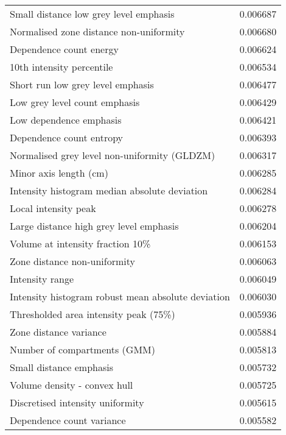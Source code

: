 \begin{longtable}{|lr|}
Small distance low grey level emphasis             &        0.006687 \\
Normalised zone distance non-uniformity            &        0.006680 \\
Dependence count energy                            &        0.006624 \\
10th intensity percentile                          &        0.006534 \\
Short run low grey level emphasis                  &        0.006477 \\
Low grey level count emphasis                      &        0.006429 \\
Low dependence emphasis                            &        0.006421 \\
Dependence count entropy                           &        0.006393 \\
Normalised grey level non-uniformity (GLDZM)       &        0.006317 \\
Minor axis length (cm)                             &        0.006285 \\
Intensity histogram median absolute deviation      &        0.006284 \\
Local intensity peak                               &        0.006278 \\
Large distance high grey level emphasis            &        0.006204 \\
Volume at intensity fraction 10\%                   &        0.006153 \\
Zone distance non-uniformity                       &        0.006063 \\
Intensity range                                    &        0.006049 \\
Intensity histogram robust mean absolute deviation &        0.006030 \\
Thresholded area intensity peak (75\%)              &        0.005936 \\
Zone distance variance                             &        0.005884 \\
Number of compartments (GMM)                       &        0.005813 \\
Small distance emphasis                            &        0.005732 \\
Volume density - convex hull                       &        0.005725 \\
Discretised intensity uniformity                   &        0.005615 \\
Dependence count variance                          &        0.005582 \\

\end{longtable}
